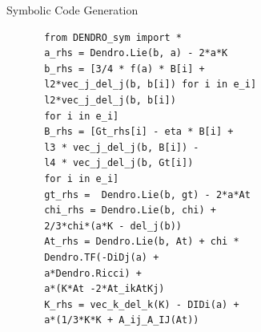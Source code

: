 \documentclass[16pt,xcolor=table]{beamer}
\begin{document}
\begin{frame}[fragile]{Symbolic Code Generation}
\begin{figure}
\begin{minipage}[t]{.52\textwidth}
\begin{verbatim}
 from DENDRO_sym import *
 a_rhs = Dendro.Lie(b, a) - 2*a*K
 b_rhs = [3/4 * f(a) * B[i] + 
 l2*vec_j_del_j(b, b[i]) for i in e_i]
 l2*vec_j_del_j(b, b[i]) 
 for i in e_i]
 B_rhs = [Gt_rhs[i] - eta * B[i] + 
 l3 * vec_j_del_j(b, B[i]) - 
 l4 * vec_j_del_j(b, Gt[i]) 
 for i in e_i]
 gt_rhs =  Dendro.Lie(b, gt) - 2*a*At
 chi_rhs = Dendro.Lie(b, chi) + 
 2/3*chi*(a*K - del_j(b)) 
 At_rhs = Dendro.Lie(b, At) + chi *
 Dendro.TF(-DiDj(a) + 
 a*Dendro.Ricci) +
 a*(K*At -2*At_ikAtKj)
 K_rhs = vec_k_del_k(K) - DIDi(a) +
 a*(1/3*K*K + A_ij_A_IJ(At)) 
\end{verbatim}
	\end{minipage}
	\vspace{-0.15in}
\end{figure}
\end{frame}
\end{document}
